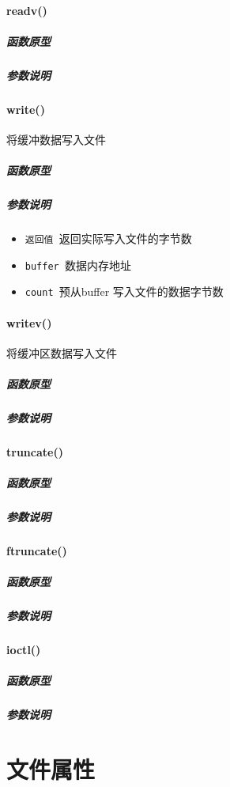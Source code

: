 \documentclass[UTF8,a4paper,12pt]{ctexbook}
\begin{document}
		\paragraph{readv()}
			\subparagraph{函数原型}
				
			\subparagraph{参数说明}	
				
		\paragraph{write()}将缓冲数据写入文件
			\subparagraph{函数原型}
				
			\subparagraph{参数说明}
				\begin{itemize}[itemindent = 1em]
					\item \verb|返回值 |返回实际写入文件的字节数
					\item \verb|buffer |数据内存地址
					\item \verb|count |预从buffer 写入文件的数据字节数
				\end{itemize}
		
		\paragraph{writev()}将缓冲区数据写入文件
			\subparagraph{函数原型}
				
			\subparagraph{参数说明}		
		\paragraph{truncate()}
			\subparagraph{函数原型}
				
			\subparagraph{参数说明}		
		\paragraph{ftruncate()}
			\subparagraph{函数原型}
				
			\subparagraph{参数说明}		
		\paragraph{ioctl()}
			\subparagraph{函数原型}
				
			\subparagraph{参数说明}
					
	\section{文件属性}
\end{document}
